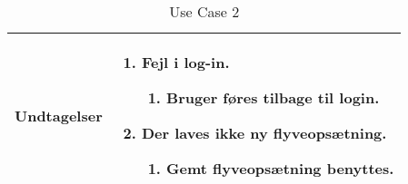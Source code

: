 \begin{table}[H]
\begin{tabular}{|l|p{10cm}|}
Undtagelser							& 

									\renewcommand{\labelenumi}{\Roman{enumi}:}
									\renewcommand{\labelenumii}{\alph{enumii})}
									\begin{enumerate}[topsep=0.0cm,leftmargin=0.5cm]
										\item Fejl i log-in.
											\begin{enumerate}[topsep=0cm, leftmargin=1cm]
												\item Bruger føres tilbage til login.
											\end{enumerate}
										\vspace{0.4cm}
										\item Der laves ikke ny flyveopsætning.
											\begin{enumerate}[topsep=0cm, leftmargin=1cm]
												\item Gemt flyveopsætning benyttes.
											\end{enumerate}
									\end{enumerate} \\\hline
										

\end{tabular}
\caption{Use Case 2}
\label{tab:UC2}
\end{table}